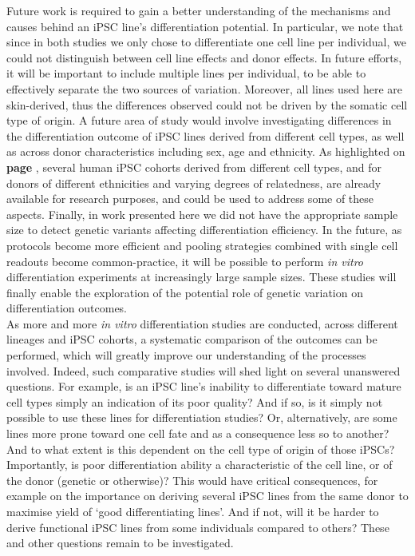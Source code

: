 Future work is required to gain a better understanding of the mechanisms and causes behind an iPSC line's differentiation potential.
In particular, we note that since in both studies we only chose to differentiate one cell line per individual, we could not distinguish between cell line effects and donor effects.
In future efforts, it will be important to include multiple lines per individual, to be able to effectively separate the two sources of variation.
Moreover, all lines used here are skin-derived, thus the differences observed could not be driven by the somatic cell type of origin.
A future area of study would involve investigating differences in the differentiation outcome of iPSC lines derived from different cell types, as well as across donor characteristics including sex, age and ethnicity.
As highlighted on \textbf{page \pageref{sec:HipSci}}, several human iPSC cohorts derived from different cell types, and for donors of different ethnicities and varying degrees of relatedness, are already available for research purposes, and could be used to address some of these aspects.
Finally, in work presented here we did not have the appropriate sample size to detect genetic variants affecting differentiation efficiency.
In the future, as protocols become more efficient and pooling strategies combined with single cell readouts become common-practice, it will be possible to perform \textit{in vitro} differentiation experiments at increasingly large sample sizes.
These studies will finally enable the exploration of the potential role of genetic variation on differentiation outcomes. \\

As more and more \textit{in vitro} differentiation studies are conducted, across different lineages and iPSC cohorts, a systematic comparison of the outcomes can be performed, which will greatly improve our understanding of the processes involved.
Indeed, such comparative studies will shed light on several unanswered questions.
For example, is an iPSC line's inability to differentiate toward mature cell types simply an indication of its poor quality?
And if so, is it simply not possible to use these lines for differentiation studies?
Or, alternatively, are some lines more prone toward one cell fate and as a consequence less so to another?
And to what extent is this dependent on the cell type of origin of those iPSCs?
Importantly, is poor differentiation ability a characteristic of the cell line, or of the donor (genetic or otherwise)?
This would have critical consequences, for example on the importance on deriving several iPSC lines from the same donor to maximise yield of `good differentiating lines'.
And if not, will it be harder to derive functional iPSC lines from some individuals compared to others?
These and other questions remain to be investigated.

